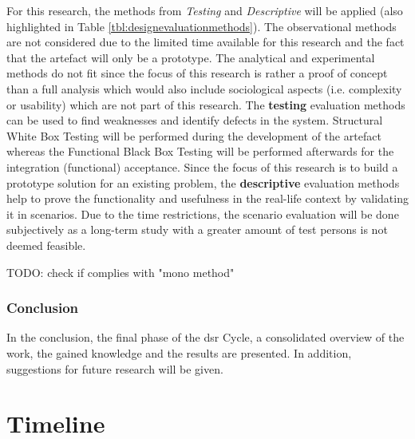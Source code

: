 For this research, the methods from \textit{Testing} and \textit{Descriptive} will be applied (also highlighted in Table \ref{tbl:designevaluationmethods}). \newline
The observational methods are not considered due to the limited time available for this research and the fact that the artefact will only be a prototype. The analytical and experimental methods do not fit since the focus of this research is rather a proof of concept than a full analysis which would also include sociological aspects (i.e. complexity or usability) which are not part of this research.\newline
The \textbf{testing} evaluation methods can be used to find weaknesses and identify defects in the system. Structural White Box Testing will be performed during the development of the artefact whereas the Functional Black Box Testing will be performed afterwards for the integration (functional) acceptance. \newline
Since the focus of this research is to build a prototype solution for an existing problem, the \textbf{descriptive} evaluation methods help to prove the functionality and usefulness in the real-life context by validating it in scenarios. Due to the time restrictions, the scenario evaluation will be done subjectively as a long-term study with a greater amount of test persons is not deemed feasible.

TODO: check if complies with "mono method"


\subsubsection{Conclusion}

In the conclusion, the final phase of the \gls{dsr} Cycle, a consolidated overview of the work, the gained knowledge and the results are presented. In addition, suggestions for future research will be given.



\section{Timeline}

